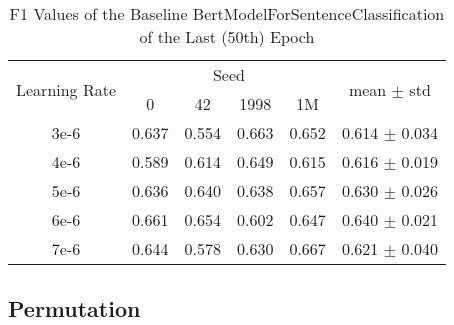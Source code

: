 \begin{table}[h]
    \centering
    \caption{F1 Values of the Baseline BertModelForSentenceClassification of the Last (50th) Epoch}
    \label{tab:my-table}
    \begin{tabular}{|c||cccc|c|}
    \hline
    \multicolumn{1}{|l||}{\multirow{2}{*}{Learning Rate}} & \multicolumn{4}{c|}{Seed}                                                                    & \multicolumn{1}{c|}{\multirow{2}{*}{mean $\pm$ std}} \\ \cline{2-5}
    \multicolumn{1}{|l||}{}                               & \multicolumn{1}{c|}{0}     & \multicolumn{1}{c|}{42}    & \multicolumn{1}{c|}{1998}  & 1M    & \multicolumn{1}{c|}{}                                \\ \hline\hline
    3e-6                                                 & \multicolumn{1}{c|}{0.637} & \multicolumn{1}{c|}{0.554} & \multicolumn{1}{c|}{0.663} & 0.652 & 0.614 $\pm$ 0.034                           \\ \hline
    4e-6                                                 & \multicolumn{1}{c|}{0.589} & \multicolumn{1}{c|}{0.614} & \multicolumn{1}{c|}{0.649} & 0.615 & 0.616 $\pm$ 0.019                                    \\ \hline
    5e-6                                                 & \multicolumn{1}{c|}{0.636} & \multicolumn{1}{c|}{0.640} & \multicolumn{1}{c|}{0.638} & 0.657 & 0.630 $\pm$ 0.026                                    \\ \hline
    6e-6                                                 & \multicolumn{1}{c|}{0.661} & \multicolumn{1}{c|}{0.654} & \multicolumn{1}{c|}{0.602} & 0.647 & 0.640 $\pm$ 0.021                                    \\ \hline
    7e-6                                                 & \multicolumn{1}{c|}{0.644} & \multicolumn{1}{c|}{0.578} & \multicolumn{1}{c|}{0.630} & 0.667 & 0.621 $\pm$ 0.040                                    \\ \hline
    \end{tabular}
\end{table}












\newpage
\subsection{Permutation}

